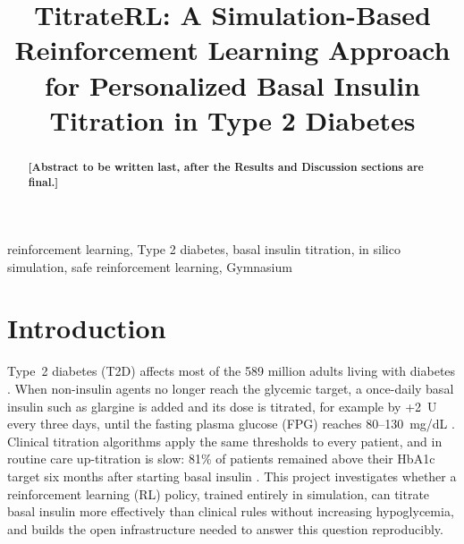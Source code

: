 \documentclass[conference]{IEEEtran}
\begin{document}
\title{TitrateRL: A Simulation-Based Reinforcement Learning Approach for Personalized Basal
Insulin Titration in Type 2 Diabetes}

\author{
}

\maketitle

\begin{abstract}
\textbf{[Abstract to be written last, after the Results and Discussion sections are final.]}
\end{abstract}

\begin{IEEEkeywords}
reinforcement learning, Type 2 diabetes, basal insulin titration, in silico simulation, safe
reinforcement learning, Gymnasium
\end{IEEEkeywords}

\section{Introduction}
Type~2 diabetes (T2D) affects most of the 589 million adults living with diabetes
\cite{idf2025}. When non-insulin agents no longer reach the glycemic target, a once-daily basal
insulin such as glargine is added and its dose is titrated, for example by +2~U every three
days, until the fasting plasma glucose (FPG) reaches 80--130~mg/dL
\cite{ada2026pharm,ada2026goals}. Clinical titration algorithms apply the same thresholds to
every patient, and in routine care up-titration is slow: 81\% of patients remained above their
HbA1c target six months after starting basal insulin \cite{mocarski2018}. This project
investigates whether a reinforcement learning (RL) policy, trained entirely in simulation, can
titrate basal insulin more effectively than clinical rules without increasing hypoglycemia, and
builds the open infrastructure needed to answer this question reproducibly.
\end{document}
